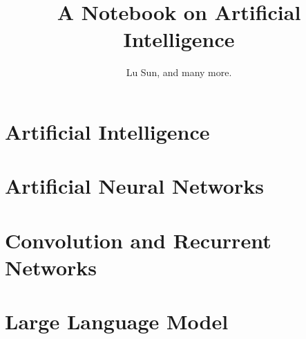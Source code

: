 

\makeindex



\frontmatter

\title{A Notebook on Artificial Intelligence}
\author{Lu Sun, and many more.}

\maketitle


\tableofcontents


\listoffigures
\listoftables

\mainmatter

\part{Artificial Intelligence}











\part{Artificial Neural Networks}





\part{Convolution and Recurrent Networks}





\part{Large Language Model}









\appendix






\printindex


